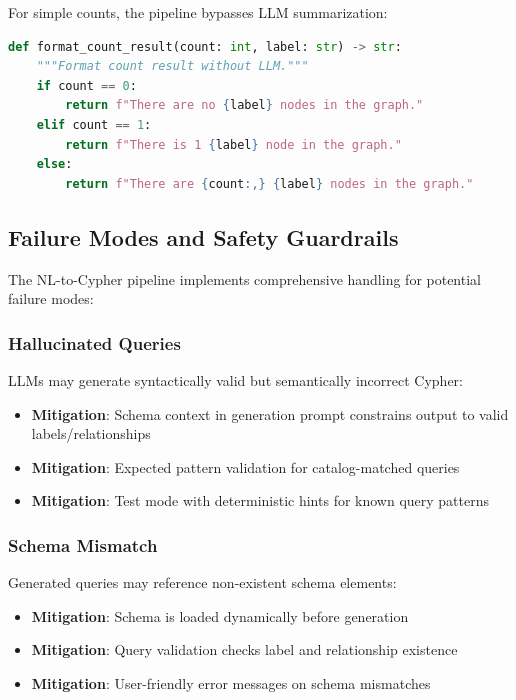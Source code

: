 For simple counts, the pipeline bypasses LLM summarization:

\begin{lstlisting}[language=Python, caption={Direct count formatting}, label=lst:count-format]
def format_count_result(count: int, label: str) -> str:
    """Format count result without LLM."""
    if count == 0:
        return f"There are no {label} nodes in the graph."
    elif count == 1:
        return f"There is 1 {label} node in the graph."
    else:
        return f"There are {count:,} {label} nodes in the graph."
\end{lstlisting}

\subsection{Failure Modes and Safety Guardrails}
\label{subsec:failure-modes}

The NL-to-Cypher pipeline implements comprehensive handling for potential failure modes:

\subsubsection{Hallucinated Queries}

LLMs may generate syntactically valid but semantically incorrect Cypher:

\begin{itemize}
    \item \textbf{Mitigation}: Schema context in generation prompt constrains output to valid labels/relationships
    \item \textbf{Mitigation}: Expected pattern validation for catalog-matched queries
    \item \textbf{Mitigation}: Test mode with deterministic hints for known query patterns
\end{itemize}

\subsubsection{Schema Mismatch}

Generated queries may reference non-existent schema elements:

\begin{itemize}
    \item \textbf{Mitigation}: Schema is loaded dynamically before generation
    \item \textbf{Mitigation}: Query validation checks label and relationship existence
    \item \textbf{Mitigation}: User-friendly error messages on schema mismatches
\end{itemize}

